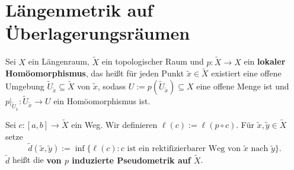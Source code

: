 \section{Längenmetrik auf Überlagerungsräumen}
\label{sec:2.2}

\begin{definition}
\label{def:2.23}
	Sei $X$ ein Längenraum, $\tilde{X}$ ein topologischer Raum und $p \colon \tilde{X} \rightarrow X$ ein \textbf{lokaler Homöomorphismus}, das heißt für jeden Punkt $\tilde{x} \in \tilde{X}$ existiert eine offene Umgebung $\tilde{U}_{\tilde{x}} \subseteq \tilde{X}$ von $\tilde{x}$, sodass $U := p(\tilde{U}_{\tilde{x}}) \subseteq X$ eine offene Menge ist und $p \big|_{\tilde{U}_{\tilde{x}}}\colon \tilde{U}_{\tilde{x}} \rightarrow U$ ein Homöomorphismus ist. 
	
	Sei $c \colon [a,b] \rightarrow \tilde{X}$ ein Weg.
	Wir definieren $\ell(c) := \ell(p \circ c)$.
	Für $\tilde{x}, \tilde{y} \in \tilde{X}$ setze
	\[
		\tilde{d}(\tilde{x},\tilde{y}) := \inf \{ \ell(c) : c \text{ ist ein rektifizierbarer Weg von } \tilde{x} \text{ nach } \tilde{y}\}.
	\]
	$\tilde{d}$ heißt die \textbf{von $p$ induzierte Pseudometrik auf $\tilde{X}$}. 
\end{definition}

